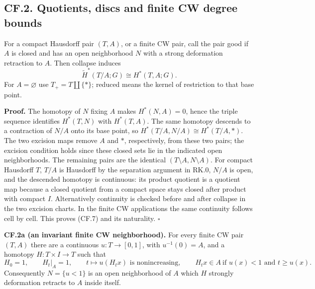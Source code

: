 \documentclass[
  11pt,
]{article}
\begin{document}
\subsection{CF.2. Quotients, discs and finite CW degree
bounds}\label{cf.2.-quotients-discs-and-finite-cw-degree-bounds}

For a compact Hausdorff pair \((T,A)\), or a finite CW pair, call the
pair good if \(A\) is closed and has an open neighborhood \(N\) with a
strong deformation retraction to \(A\). Then collapse induces \[
\widetilde H^*(T/A;G)\cong H^*(T,A;G).
\tag{CF.7}
\] For \(A=\varnothing\) use \(T_+=T\amalg\{*\}\); reduced means the
kernel of restriction to that base point.

\textbf{Proof.} The homotopy of \(N\) fixing \(A\) makes \(H^*(N,A)=0\),
hence the triple sequence identifies \(H^*(T,N)\) with \(H^*(T,A)\). The
same homotopy descends to a contraction of \(N/A\) onto its base point,
so \(H^*(T/A,N/A)\cong H^*(T/A,*)\). The two excision maps remove \(A\)
and \(*\), respectively, from these two pairs; the excision condition
holds since these closed sets lie in the indicated open neighborhoods.
The remaining pairs are the identical \((T\setminus A,N\setminus A)\).
For compact Hausdorff \(T\), \(T/A\) is Hausdorff by the separation
argument in RK.0, \(N/A\) is open, and the descended homotopy is
continuous: its product quotient is a quotient map because a closed
quotient from a compact space stays closed after product with compact
\(I\). Alternatively continuity is checked before and after collapse in
the two excision charts. In the finite CW applications the same
continuity follows cell by cell. This proves (CF.7) and its naturality.
\(\square\)

\textbf{CF.2a (an invariant finite CW neighborhood).} For every finite
CW pair \((T,A)\) there are a continuous \(u:T\to[0,1]\), with
\(u^{-1}(0)=A\), and a homotopy \(H:T\times I\to T\) such that \[
H_0=1,\qquad H_t|_A=1,\qquad
t\longmapsto u(H_t x)\text{ is nonincreasing},\qquad
H_t x\in A\ \text{if }u(x)<1\text{ and }t\geq u(x).
\] Consequently \(N=\{u<1\}\) is an open neighborhood of \(A\) which
\(H\) strongly deformation retracts to \(A\) inside itself.
\end{document}
